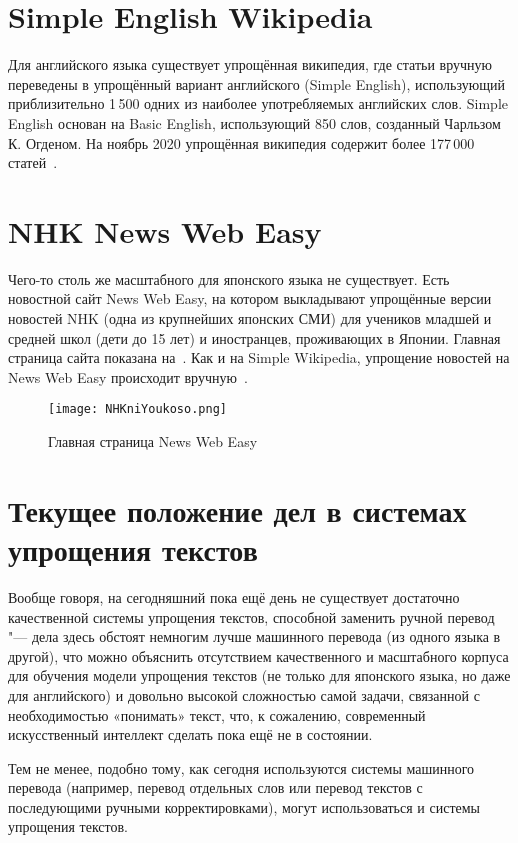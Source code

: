 \section{Simple English Wikipedia}


Для английского языка существует упрощённая википедия, где статьи вручную переведены в упрощённый вариант английского (Simple English), использующий приблизительно 1\,500 одних из наиболее употребляемых английских слов.
Simple English основан на Basic English, использующий 850 слов, созданный Чарльзом К. Огденом.
На ноябрь 2020 упрощённая википедия содержит более 177\,000 статей~\cite{SimpleWiki}.


\section{NHK News Web Easy}


Чего-то столь же масштабного для японского языка не существует.
Есть новостной сайт News Web Easy, на котором выкладывают упрощённые версии новостей NHK (одна из крупнейших японских СМИ) для учеников младшей и средней школ (дети до 15 лет) и иностранцев, проживающих в Японии.
Главная страница сайта показана на~.
Как и на Simple Wikipedia, упрощение новостей на News Web Easy происходит вручную~\cite{NHKnews}.
\begin{figure}[H]%
  \centering
  \texttt{[image: NHKniYoukoso.png]}
  \caption{Главная страница News Web Easy}
  \label{NHK}
\end{figure}


\section{Текущее положение дел в системах упрощения текстов}


Вообще говоря, на сегодняшний пока ещё день не существует достаточно качественной системы упрощения текстов, способной заменить ручной перевод "--- дела здесь обстоят немногим лучше машинного перевода (из одного языка в другой), что можно объяснить отсутствием качественного и масштабного корпуса для обучения модели упрощения текстов (не только для японского языка, но даже для английского) и довольно высокой сложностью самой задачи, связанной с необходимостью «понимать» текст, что, к сожалению, современный искусственный интеллект сделать пока ещё не в состоянии.

Тем не менее, подобно тому, как сегодня используются системы машинного перевода (например, перевод отдельных слов или перевод текстов с последующими ручными корректировками), могут использоваться и системы упрощения текстов.
